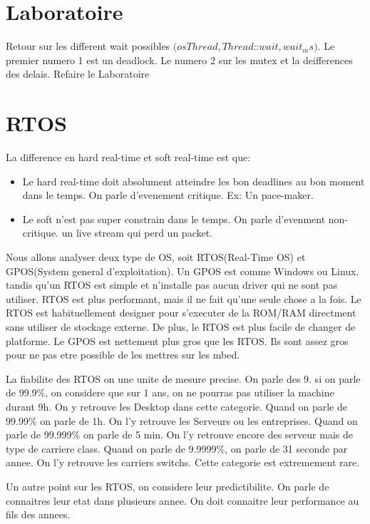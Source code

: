\documentclass{article}
\begin{document}
	\section{Laboratoire}
	Retour sur les different wait possibles $(osThread, Thread$::$wait, wait_ms)$. Le premier numero 1 est un deadlock. Le numero 2 sur les mutex et la deifferences des delais. Refaire le Laboratoire
	\section{RTOS}
	La difference en hard real-time et soft real-time est que:
	\begin{itemize}
	\item Le hard real-time doit absolument atteindre les bon deadlines au bon moment dans le temps. On parle d'evenement critique. Ex: Un pace-maker.
	\item Le soft n'est pas super constrain dans le temps. On parle d'evenment non-critique. un live stream qui perd un packet.
	\end{itemize}
	Nous allons analyser deux type de OS, soit	RTOS(Real-Time OS) et GPOS(System general d'exploitation). Un GPOS est comme Windows ou Linux. tandis qu'un RTOS est simple et n'installe pas aucun driver qui ne sont pas utiliser. RTOS est plus performant, mais il ne fait qu'une seule chose a la fois. Le RTOS est habituellement designer pour s'executer de la ROM/RAM directment sans utiliser de stockage externe. De plus, le RTOS est plus facile de changer de platforme. Le GPOS est nettement plus gros que les RTOS. Ils sont assez gros pour ne pas etre possible de les mettres sur les mbed.
\newline
\par
\noindent	
La fiabilite des RTOS on une unite de mesure precise. On parle des 9. si on parle de 99.9\%, on considere que sur 1 ans, on ne pourras pas utiliser la machine durant 9h. On y retrouve les Desktop dans cette categorie. Quand on parle de 99.99\% on parle de 1h. On l'y retrouve les Serveurs ou les entreprises. Quand on parle de 99.999\% on parle de 5 min. On l'y retrouve encore des serveur mais de type de carriere class. Quand on parle de 9.9999\%, on parle de 31 seconde par annee. On l'y retrouve les carriers switchs. Cette categorie est extremement rare. 
\newline
\par
\noindent
Un autre point sur les RTOS, on considere leur predictibilite. On parle de connaitres leur etat dans plusieurs annee. On doit connaitre leur performance au fils des annees. 
\end{document}
